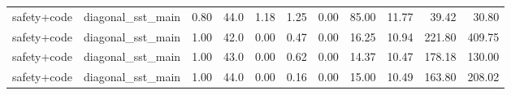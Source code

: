 \begin{table}[H]
{\begin{tabular}{llllrrrrrrr}
safety+code & diagonal\_sst\_main & 0.80 & 44.0 & 1.18 & 1.25 & 0.00 & 85.00 & 11.77 & 39.42 & 30.80 \\
safety+code & diagonal\_sst\_main & 1.00 & 42.0 & 0.00 & 0.47 & 0.00 & 16.25 & 10.94 & 221.80 & 409.75 \\
safety+code & diagonal\_sst\_main & 1.00 & 43.0 & 0.00 & 0.62 & 0.00 & 14.37 & 10.47 & 178.18 & 130.00 \\
safety+code & diagonal\_sst\_main & 1.00 & 44.0 & 0.00 & 0.16 & 0.00 & 15.00 & 10.49 & 163.80 & 208.02 \\
\bottomrule
\end{tabular}
}
\end{table}